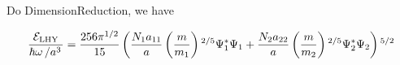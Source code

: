 Do DimensionReduction, we have

\begin{equation}
\begin{split}
\frac{\mathcal{E}_{\text{LHY}}}{\hbar  \omega \left/a^3\right.}=\frac{256\pi ^{1/2}}{15}\left(\frac{N_1a_{11}}{a}\left(\frac{m}{m_1}\right){}^{2/5}\Psi
_1^*\Psi _1+ \frac{N_2a_{22}}{a}\left(\frac{m}{m_2}\right){}^{2/5}\Psi _2^*\Psi _2\right){}^{5/2}
\end{split}
\end{equation}
